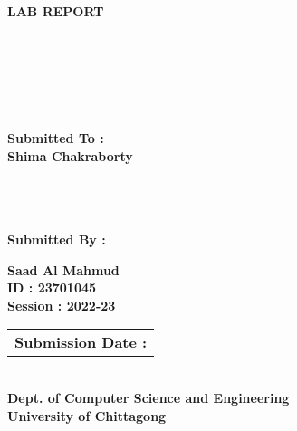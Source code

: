 \documentclass[a4paper,11pt]{article}
\begin{document}
\centering
\doublespacing
\begin{spacing}{1}
\textbf{\Huge{LAB REPORT}} \\ \vspace{1.5cm}
\end{spacing}


\begingroup
\centering
{} \\
 \\
\raggedright
{} \\
 \\ \vspace{1.5cm}
\endgroup


\begin{sub}
\centering
\textbf{Submitted To :} \\
\textbf{\Large{Shima Chakraborty}} \\
 \\
 \\
 \\ \vspace{1cm}
\end{sub}


\begingroup
\centering
\textbf{Submitted By :} \\
\endgroup

\begin{name}
\centering
\doublespacing
\textbf{\large{ Saad Al Mahmud }} \\ \vspace{0.5cm}
\textbf{\large{ID : 23701045}} \\ \vspace{0.5cm}
\textbf{\large{Session : 2022-23}} \\ \vspace{1cm}
\end{name}

\begin{tabular}{|c|}
\hline
\textbf{\Large{Submission Date : }} \hspace{6cm} \vspace{1.2cm}
\end{tabular}



\begingroup
\centering
{} \\
\textbf{\Large{Dept. of Computer Science and Engineering}} \\
\textbf{\LARGE{University of Chittagong}} \\
\endgroup
\end{document}
